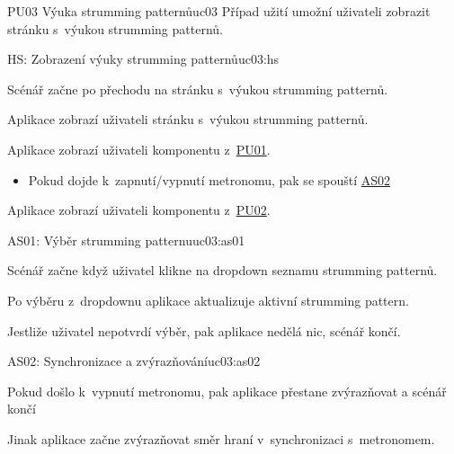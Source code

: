 \begin{usecase}{PU03 Výuka strumming patternů}{uc03}
    Případ užití umožní uživateli zobrazit stránku s~výukou strumming patternů.

    \begin{scenario}{HS: Zobrazení výuky strumming patternů}{uc03:hs}
        \item Scénář začne po přechodu na stránku s~výukou strumming patternů.
        \item Aplikace zobrazí uživateli stránku s~výukou strumming patternů.
        \item Aplikace zobrazí uživateli komponentu z~\hyperref[uc01]{PU01}.
        \begin{itemize}
            \item Pokud dojde k~zapnutí/vypnutí metronomu, pak se spouští \hyperref[uc3:as02]{AS02}
        \end{itemize}
        \item Aplikace zobrazí uživateli komponentu z~\hyperref[uc02]{PU02}.
    \end{scenario}


    \begin{scenario}{AS01: Výběr strumming patternu}{uc03:as01}
        \item Scénář začne když uživatel klikne na dropdown seznamu strumming patternů.
        \item Po výběru z~dropdownu aplikace aktualizuje aktivní strumming pattern.
        \item Jestliže uživatel nepotvrdí výběr, pak aplikace nedělá nic, scénář končí.

    \end{scenario}

    \begin{scenario}{AS02: Synchronizace a zvýrazňování}{uc03:as02}
        \item Pokud došlo k~vypnutí metronomu, pak aplikace přestane zvýrazňovat a scénář končí
        \item Jinak aplikace začne zvýrazňovat směr hraní v~synchronizaci s~metronomem.
    \end{scenario}
\end{usecase}